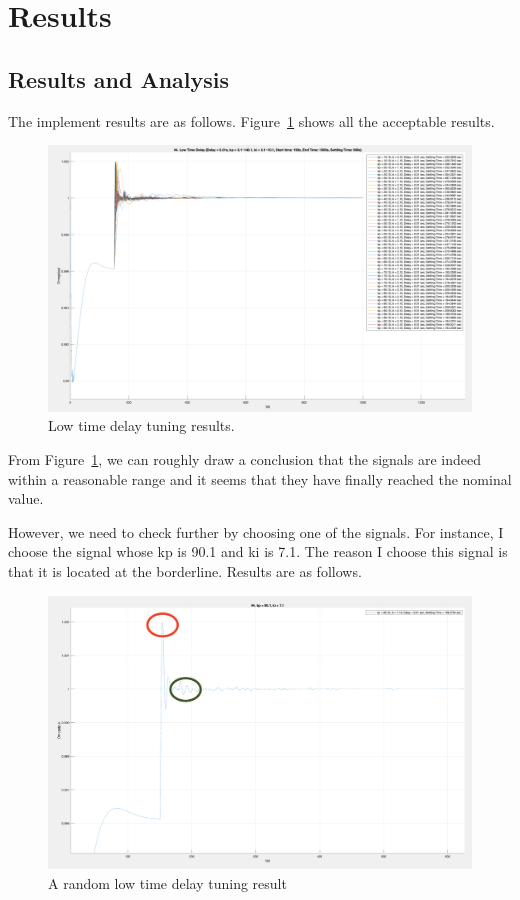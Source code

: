 \section{Results} %
\label{section4.4}
\subsection{Results and Analysis} %
The implement results are as follows. Figure~\ref{4_4_1_result1} shows all the acceptable results.

\begin{figure}[htbp]
\centering
\includegraphics[width = .819\textwidth]{figure/4_4_1_result1.png}
\caption{Low time delay tuning results.}
\label{4_4_1_result1}
\end{figure}

From Figure~\ref{4_4_1_result1}, we can roughly draw a conclusion that the signals are indeed within a reasonable range and it seems that they have finally reached the nominal value.

However, we need to check further by choosing one of the signals. For instance, I choose the signal whose kp is 90.1 and ki is 7.1. The reason I choose this signal is that it is located at the borderline. Results are as follows.\\

\begin{figure}[htbp]
\centering
\includegraphics[width = .819\textwidth]{figure/4_4_1_result2.png}
\caption{A random low time delay tuning result}
\label{4_4_1_result2}
\end{figure}

